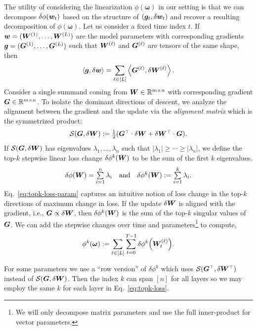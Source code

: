 \documentclass{article} %
\newcommand{\inner}[2]{\left\langle #1, #2 \right\rangle}
\newcommand{\traj}{\bm{\omega}}
\newcommand{\sym}{\mathcal{S}}
\begin{document}
The utility of considering the linearization $\phi(\traj)$ in our setting is that we can decompose $\delta \phi({\boldsymbol w}_t)$ based on the structure of $({\boldsymbol g}_t, \delta {\boldsymbol w}_t)$ and recover a resulting decomposition of $\phi(\traj)$. Let us consider a fixed time index $t$. If ${\boldsymbol w} = ({\boldsymbol W}^{(1)}, \ldots, {\boldsymbol W}^{(L)})$ are the model parameters with corresponding gradients ${\boldsymbol g} = ({\boldsymbol G}^{(1)}, \ldots, {\boldsymbol G}^{(L)})$ such that ${\boldsymbol W}^{(\ell)}$ and ${\boldsymbol G}^{(\ell)}$ are tensors of the same shape, then 
\[
    \inner{\bg}{\delta \bw} = \sum\limits_{\ell \in [L]} \inner{\bG^{(\ell)}}{\delta \bW^{(\ell)}}.
\]
Consider a single summand coming from ${\boldsymbol W} \in \mathbb{R}^{m \times n}$ with corresponding gradient ${\boldsymbol G} \in \mathbb{R}^{m \times n}$. To
isolate the dominant directions of descent, we analyze the alignment between the gradient and the update via the \emph{alignment matrix} which is the symmetrized product:
\begin{equation}\label{eq:alignmat}
    \sym(\bG, \delta \bW) := \textstyle\frac{1}{2}(\bG^\top \cdot \delta \bW + \delta \bW^\top \cdot \bG).
\end{equation}
If $\sym(\bG, \delta \bW)$ has eigenvalues $\lambda_1, \ldots, \lambda_n$ such that $|\lambda_1| \geq \cdots \geq |\lambda_n|$, we define the top-$k$ stepwise linear loss change $\delta \phi^k({\boldsymbol W})$ to be the sum of the first $k$ eigenvalues.
\begin{equation}\label{eq:topk-loss-param}
    \delta \phi({\boldsymbol W}) = \textstyle\sum\limits_{i=1}^n \lambda_i~~ \text{ and }~~ \delta \phi^k({\boldsymbol W}) := \textstyle\sum\limits_{i = 1}^k \lambda_i.
\end{equation}
Eq.\ \eqref{eq:topk-loss-param} captures an intuitive notion of loss change in the top-$k$ directions of maximum change in loss. If the update $\delta {\boldsymbol W}$ is aligned with the gradient, i.e., ${\boldsymbol G} \propto  \delta {\boldsymbol W}$, then $\delta \phi^k({\boldsymbol W})$ is the sum of the top-$k$ singular values of ${\boldsymbol G}$. We can add the stepwise changes over time and parameters\footnote{We will only decompose matrix parameters and use the full inner-product for vector parameters. \vspace{-3mm}} to compute, 
\begin{equation}\label{eq:topk-loss}
    \phi^k(\traj) := \sum\limits_{\ell \in [L]} \sum\limits_{t = 0}^{T-1} \delta \phi^k\qty(\bW^{(\ell)}_t). 
\end{equation}

For some parameters we use a ``row version'' of $\delta \phi^k$ which uses $\sym(\bG^\top, \delta \bW^\top)$ instead of $\sym(\bG, \delta \bW)$. Then the index $k$ can span $[n]$ for all layers so we may employ the same $k$ for each layer in Eq.\ \eqref{eq:topk-loss}.  
\end{document}
